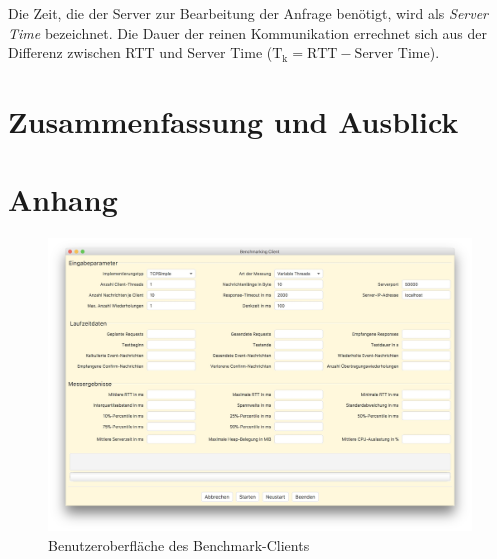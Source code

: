 \documentclass[11pt,a4paper,titlepage]{scrartcl}
\numberwithin{equation}{section}
\begin{document}
\noindent Die Zeit, die der Server zur Bearbeitung der Anfrage benötigt, wird als \textit{Server Time} bezeichnet. Die Dauer der reinen Kommunikation errechnet sich aus der Differenz zwischen RTT und Server Time ($ \text{T}_{\text{k}} = \text{RTT}-\text{Server Time} $).
\newpage
\section{Zusammenfassung und Ausblick}

\newpage
\appendix
{}
\printbibliography
\newpage
\listoffigures
\newpage
\listoftables
\newpage
\lstlistoflistings
\newpage
\section{Anhang}
\begin{figure}[ht] 
	\begin{center}
		\includegraphics[scale=0.17]{img/benchClientUI.jpg}
		\caption[]{Benutzeroberfläche des Benchmark-Clients}
		\label{fig:dakoBenchClientUI}
	\end{center}
\end{figure}
\end{document}

